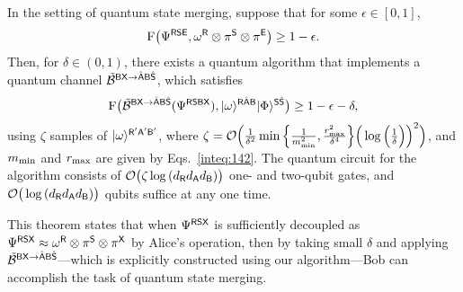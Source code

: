 \begin{theorem}
\label{thm:Uhlmann state merging}
    In the setting of quantum state merging, suppose that for some $\epsilon \in [0, 1]$,  
    \begin{align}
    \label{inteq:141}
            {\mathrm{F}}\big(\Psi^{{\mathsf{R}}{\mathsf{S}}{\mathsf{E}}}, \omega^{\mathsf{R}} \otimes \pi^{\mathsf{S}} \otimes \pi^{\mathsf{E}} \big) \geq 1 - \epsilon.
    \end{align}
    Then, for $\delta \in (0, 1)$, there exists a quantum algorithm that implements a quantum channel $\tilde{{\mathcal{B}}}^{{\mathsf{B}}{\mathsf{X}}\rightarrow\hat{{\mathsf{A}}}{\mathsf{B}}\hat{{\mathsf{S}}}}$, which satisfies
    \begin{align}
        {\mathrm{F}}\big(\tilde{{\mathcal{B}}}^{{\mathsf{B}}{\mathsf{X}}\rightarrow\hat{{\mathsf{A}}}{\mathsf{B}}\hat{{\mathsf{S}}}}(\Psi^{{\mathsf{R}}{\mathsf{S}}{\mathsf{B}}{\mathsf{X}}}), |\omega\rangle^{{\mathsf{R}}\hat{{\mathsf{A}}}{\mathsf{B}}}|\Phi\rangle^{{\mathsf{S}}\hat{{\mathsf{S}}}}\big) \geq 1 - \epsilon - \delta,
    \end{align}
    using $\zeta$ samples of $|\omega\rangle^{{\mathsf{R}}'{\mathsf{A}}'{\mathsf{B}}'}$, where $\zeta = {\mathcal{O}}\Big(\frac{1}{\delta^2}\min\Big\{\frac{1}{m_{\rm min}^2}, \frac{r_{\rm max}^2}{\delta^4}\Big\}\Big(\log{\Big(\frac{1}{\delta}\Big)}\Big)^2\Big)$, and $m_{\rm min}$ and $r_{\rm max}$ are given by Eqs.~\eqref{inteq:142}. The quantum circuit for the algorithm consists of ${\mathcal{O}}\big(\zeta\log{(d_{\mathsf{R}}d_{\mathsf{A}}d_{\mathsf{B}})}\big)$ one- and two-qubit gates, and ${\mathcal{O}}\big(\log{(d_{\mathsf{R}}d_{\mathsf{A}}d_{\mathsf{B}})}\big)$ qubits suffice at any one time.
\end{theorem}



This theorem states that when $\Psi^{{\mathsf{R}}{\mathsf{S}}{\mathsf{X}}}$ is sufficiently decoupled as $\Psi^{{\mathsf{R}}{\mathsf{S}}{\mathsf{X}}} \approx \omega^{\mathsf{R}} \otimes \pi^{\mathsf{S}} \otimes \pi^{\mathsf{X}}$ by Alice's operation, then by taking small $\delta$ and applying $\tilde{{\mathcal{B}}}^{{\mathsf{B}}{\mathsf{X}}\rightarrow\hat{{\mathsf{A}}}{\mathsf{B}}\hat{{\mathsf{S}}}}$---which is explicitly constructed using our algorithm---Bob can accomplish the task of quantum state merging.




